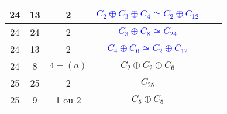 \documentclass[12pt, openany]{report}
\begin{document}
\begin{tabular}{|c||c|c|c|c|c|}
\hline  24  & 13 & 2 & \textcolor{blue}{$C_{2}\oplus C_{3}\oplus C_{4} \simeq C_{2} \oplus C_{12}$}  \\
\hline  24  & 24 & 2 & \textcolor{blue}{$ C_{3}\oplus C_{8} \simeq C_{24}$}\\
\hline  24  & 13 & 2 & \textcolor{blue}{$C_{4}\oplus C_{6} \simeq  C_{2} \oplus C_{12}$}\\
\hline  24  & 8 & $4-(a)$ & $C_{2}\oplus C_{2} \oplus C_{6}$\\
\hline  25  & 25 & 2 & $C_{25}$ \\
\hline  25  & 9 & 1 ou 2 & $C_{5}\oplus C_{5}$ \\


\hline 


\end{tabular}
\end{document}
